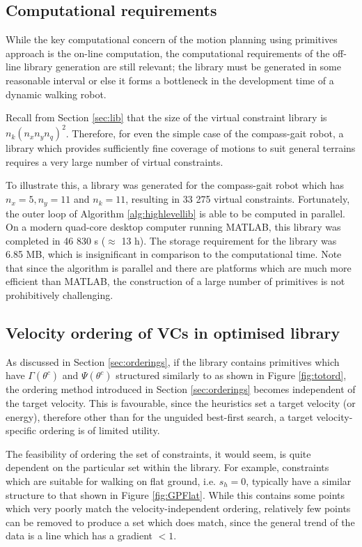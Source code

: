 \subsection{Computational requirements} \label{sec:vcgenres}
While the key computational concern of the motion planning using primitives approach is the on-line computation, the computational requirements of the off-line library generation are still relevant; the library must be generated in some reasonable interval or else it forms a bottleneck in the development time of a dynamic walking robot.

Recall from Section \ref{sec:lib} that the size of the virtual constraint library is $n_k(n_xn_yn_q)^2$. Therefore, for even the simple case of the compass-gait robot, a library which provides sufficiently fine coverage of motions to suit general terrains requires a very large number of virtual constraints.

To illustrate this, a library was generated for the compass-gait robot which has $n_x=5,n_y=11$ and $n_k=11$, resulting in 33 275 virtual constraints. Fortunately, the outer loop of Algorithm \ref{alg:highlevellib} is able to be computed in parallel. On a modern quad-core desktop computer running MATLAB, this library was completed in 46 830 s ($\approx$ 13 h). The storage requirement for the library was 6.85 MB, which is insignificant in comparison to the computational time. Note that since the algorithm is parallel and there are platforms which are much more efficient than MATLAB, the construction of a large number of primitives is not prohibitively challenging.

\subsection{Velocity ordering of VCs in optimised library}
As discussed in Section \ref{sec:orderings}, if the library contains primitives which have $\Gamma(\theta^c)$ and $\Psi(\theta^c)$ structured similarly to as shown in Figure \ref{fig:totord}, the ordering method introduced in Section \ref{sec:orderings} becomes independent of the target velocity. This is favourable, since the heuristics set a target velocity (or energy), therefore other than for the unguided best-first search, a target velocity-specific ordering is of limited utility.

The feasibility of ordering the set of constraints, it would seem, is quite dependent on the particular set within the library. For example, constraints which are suitable for walking on flat ground, i.e. $s_h=0$, typically have a similar structure to that shown in Figure \ref{fig:GPFlat}. While this contains some points which very poorly match the velocity-independent ordering, relatively few points can be removed to produce a set which does match, since the general trend of the data is a line which has a gradient $<1$.

